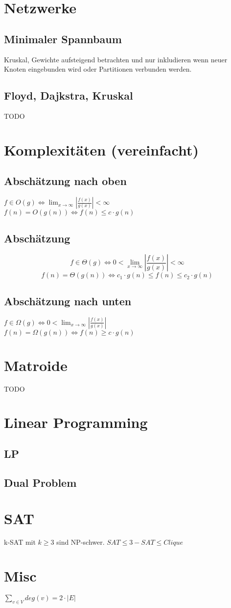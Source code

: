 \documentclass[10pt,a4paper]{article}
\newcommand{\abs}[1]{\ensuremath{\left\vert#1\right\vert}}
\begin{document}
\section{Netzwerke}
\subsection{Minimaler Spannbaum}
Kruskal, Gewichte aufsteigend betrachten und nur inkludieren wenn neuer Knoten eingebunden wird oder Partitionen verbunden werden.
\subsection{Floyd, Dajkstra, Kruskal}
TODO
\section{Komplexitäten (vereinfacht)}
\subsection{Abschätzung nach oben}
$f \in O(g) \Leftrightarrow \lim_{x \rightarrow \infty} \abs{\frac{f(x)}{g(x)}} < \infty $ \,\,\,\,\,\,\,\,\,\,\,\,\,\,\,\,\,\,\,\,\,\,\,\,\,\,\,\, $f(n) = O(g(n)) \Leftrightarrow f(n) \leq c \cdot g(n)$
\subsection{Abschätzung}
\[f \in \Theta(g) \Leftrightarrow 0 <\lim_{x \rightarrow \infty} \abs{\frac{f(x)}{g(x)}} < \infty \]
\[f(n) = \Theta(g(n)) \Leftrightarrow c_1 \cdot g(n) \leq f(n) \leq c_2 \cdot g(n)\]
\subsection{Abschätzung nach unten}
$f \in \Omega(g) \Leftrightarrow 0 < \lim_{x \rightarrow \infty} \abs{\frac{f(x)}{g(x)}}$ \,\,\,\,\,\,\,\,\,\,\,\,\,\,\,\,\,\,\,\,\,\,\,\,\,\,\,\,\,\,\,\,\,\,\,\,\,\,\, $f(n) = \Omega(g(n)) \Leftrightarrow f(n) \geq c \cdot g(n)$
\section{Matroide}
TODO
\section{Linear Programming}
\subsection{LP}
\subsection{Dual Problem}
\section{SAT}
k-SAT mit $k \geq 3$ sind NP-schwer.
$SAT \leq 3-SAT \leq Clique$
\section{Misc}
$\sum\limits_{v \in V} deg(v) = 2 \cdot |E|$
\end{document}
